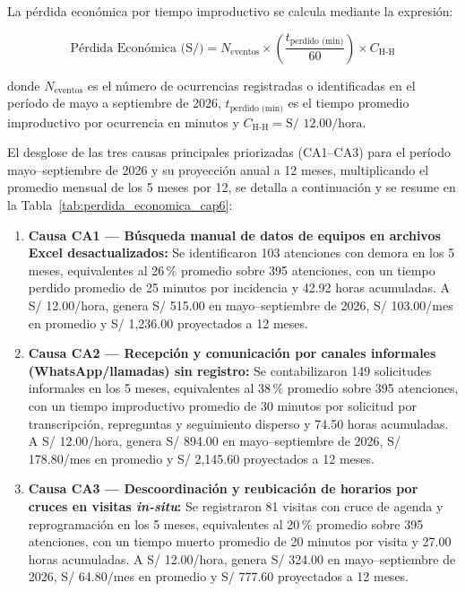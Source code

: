 La pérdida económica por tiempo improductivo se calcula mediante la expresión:

\[
\text{Pérdida Económica (S/)} = N_{\text{eventos}} \times \left(\frac{t_{\text{perdido (min)}}}{60}\right) \times C_{\text{H-H}}
\]

donde $N_{\text{eventos}}$ es el número de ocurrencias registradas o identificadas en el período de mayo a septiembre de 2026, $t_{\text{perdido (min)}}$ es el tiempo promedio improductivo por ocurrencia en minutos y $C_{\text{H-H}} = \text{S/ 12.00/hora}$.

El desglose de las tres causas principales priorizadas (CA1–CA3) para el período mayo–septiembre de 2026 y su proyección anual a 12 meses, multiplicando el promedio mensual de los 5 meses por 12, se detalla a continuación y se resume en la Tabla~\ref{tab:perdida_economica_cap6}:

\begin{enumerate}[leftmargin=1.27cm]
    \item \textbf{Causa CA1 --- Búsqueda manual de datos de equipos en archivos Excel desactualizados:} Se identificaron 103 atenciones con demora en los 5 meses, equivalentes al 26\,\% promedio sobre 395 atenciones, con un tiempo perdido promedio de 25 minutos por incidencia y 42.92 horas acumuladas. A S/ 12.00/hora, genera S/ 515.00 en mayo–septiembre de 2026, S/ 103.00/mes en promedio y S/ 1,236.00 proyectados a 12 meses.
    \item \textbf{Causa CA2 --- Recepción y comunicación por canales informales (WhatsApp/llamadas) sin registro:} Se contabilizaron 149 solicitudes informales en los 5 meses, equivalentes al 38\,\% promedio sobre 395 atenciones, con un tiempo improductivo promedio de 30 minutos por solicitud por transcripción, repreguntas y seguimiento disperso y 74.50 horas acumuladas. A S/ 12.00/hora, genera S/ 894.00 en mayo–septiembre de 2026, S/ 178.80/mes en promedio y S/ 2,145.60 proyectados a 12 meses.
    \item \textbf{Causa CA3 --- Descoordinación y reubicación de horarios por cruces en visitas \textit{in-situ}:} Se registraron 81 visitas con cruce de agenda y reprogramación en los 5 meses, equivalentes al 20\,\% promedio sobre 395 atenciones, con un tiempo muerto promedio de 20 minutos por visita y 27.00 horas acumuladas. A S/ 12.00/hora, genera S/ 324.00 en mayo–septiembre de 2026, S/ 64.80/mes en promedio y S/ 777.60 proyectados a 12 meses.
\end{enumerate}

